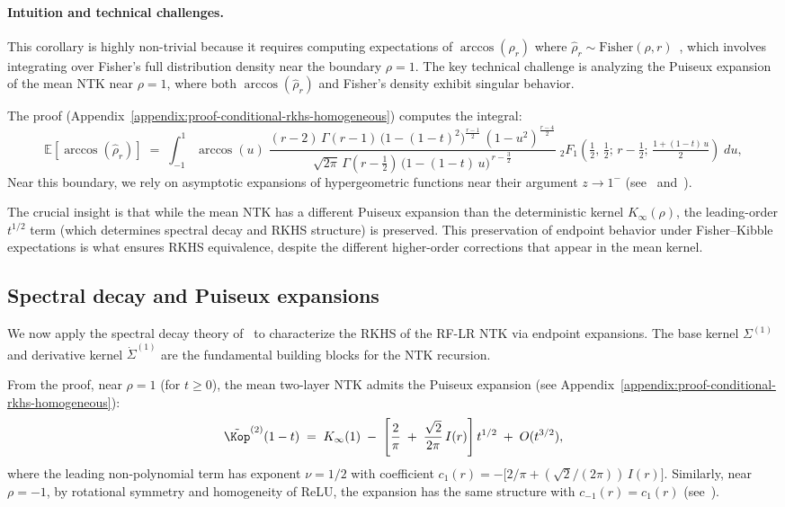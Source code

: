 \paragraph{Intuition and technical challenges.}
This corollary is highly non-trivial because it requires computing expectations of \( \arccos(\hat{\rho}_r) \) where \( \hat{\rho}_r \sim \text{Fisher}(\rho,r) \)~\cite{fisher1915probable,hotelling1953new}, which involves integrating over Fisher's full distribution density near the boundary \( \rho = 1 \). The key technical challenge is analyzing the Puiseux expansion of the mean NTK near \( \rho = 1 \), where both \( \arccos(\hat{\rho}_r) \) and Fisher's density exhibit singular behavior.

The proof (Appendix~\ref{appendix:proof-conditional-rkhs-homogeneous}) computes the integral:
\[
\mathbb{E}[\arccos(\hat{\rho}_r)] \;=\; \int_{-1}^{1} \arccos(u)\;
\frac{(r-2)\,\Gamma(r-1)\,\big(1-(1-t)^2\big)^{\frac{r-1}{2}}\,(1-u^2)^{\frac{r-4}{2}}}{\sqrt{2\pi}\,\Gamma\!\left(r-\tfrac{1}{2}\right)\,\big(1-(1-t)\,u\big)^{\,r-\frac{3}{2}}}\;
{}_2F_1\!\left(\tfrac{1}{2},\,\tfrac{1}{2};\, r-\tfrac{1}{2};\, \tfrac{1+(1-t)\,u}{2}\right)\; du,
\]
Near this boundary, we rely on asymptotic expansions of hypergeometric functions near their argument \( z \to 1^- \) (see~\cite{nist_dlmf} and~\cite{abramowitz1964handbook}).

The crucial insight is that while the mean NTK has a different Puiseux expansion than the deterministic kernel \( K_{\infty}(\rho) \), the leading-order \( t^{1/2} \) term (which determines spectral decay and RKHS structure) is preserved. This preservation of endpoint behavior under Fisher–Kibble expectations is what ensures RKHS equivalence, despite the different higher-order corrections that appear in the mean kernel.


\vspace{0.5em}
\subsection{Spectral decay and Puiseux expansions}\label{subsec:spectral-decay-puiseux}
We now apply the spectral decay theory of~\cite{bietti2021deepequalsshallowrelu} to characterize the RKHS of the RF-LR NTK via endpoint expansions. The base kernel \( \Sigma^{(1)} \) and derivative kernel \( \dot{\Sigma}^{(1)} \) are the fundamental building blocks for the NTK recursion.

From the proof, near \( \rho = 1 \) (for \( t \ge 0 \)), the mean two-layer NTK admits the Puiseux expansion (see Appendix~\ref{appendix:proof-conditional-rkhs-homogeneous}):
\[
\tilde{\Kop}^{(2)}(1-t)
\;=\;
K_\infty(1)
\;-\;
\Bigg[\frac{2}{\pi} \;+\; \frac{\sqrt{2}}{2\pi}\,I(r)\Bigg]\,t^{1/2}
\;+\; O(t^{3/2}),
\]
where the leading non-polynomial term has exponent \( \nu = 1/2 \) with coefficient \( c_1(r) = -\big[2/\pi + (\sqrt{2}/(2\pi))\,I(r)\big] \). Similarly, near \( \rho = -1 \), by rotational symmetry and homogeneity of ReLU, the expansion has the same structure with \( c_{-1}(r) = c_1(r) \) (see~\cite{bietti2021deepequalsshallowrelu}).

